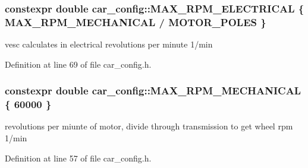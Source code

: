 \subsubsection[{\texorpdfstring{M\+A\+X\+\_\+\+R\+P\+M\+\_\+\+E\+L\+E\+C\+T\+R\+I\+C\+AL}{MAX_RPM_ELECTRICAL}}]{\setlength{\rightskip}{0pt plus 5cm}constexpr double car\+\_\+config\+::\+M\+A\+X\+\_\+\+R\+P\+M\+\_\+\+E\+L\+E\+C\+T\+R\+I\+C\+AL \{ {\bf M\+A\+X\+\_\+\+R\+P\+M\+\_\+\+M\+E\+C\+H\+A\+N\+I\+C\+AL} / {\bf M\+O\+T\+O\+R\+\_\+\+P\+O\+L\+ES} \}}\hypertarget{namespacecar__config_aaf4d6a90e2b9c983b0b0d29a584c399b}{}\label{namespacecar__config_aaf4d6a90e2b9c983b0b0d29a584c399b}


vesc calculates in electrical revolutions per minute  1/min 



Definition at line 69 of file car\+\_\+config.\+h.

\subsubsection[{\texorpdfstring{M\+A\+X\+\_\+\+R\+P\+M\+\_\+\+M\+E\+C\+H\+A\+N\+I\+C\+AL}{MAX_RPM_MECHANICAL}}]{\setlength{\rightskip}{0pt plus 5cm}constexpr double car\+\_\+config\+::\+M\+A\+X\+\_\+\+R\+P\+M\+\_\+\+M\+E\+C\+H\+A\+N\+I\+C\+AL \{ 60000 \}}\hypertarget{namespacecar__config_ad35069a183782259c6280aa219b72ffa}{}\label{namespacecar__config_ad35069a183782259c6280aa219b72ffa}


revolutions per miunte of motor, divide through transmission to get wheel rpm  1/min 



Definition at line 57 of file car\+\_\+config.\+h.

